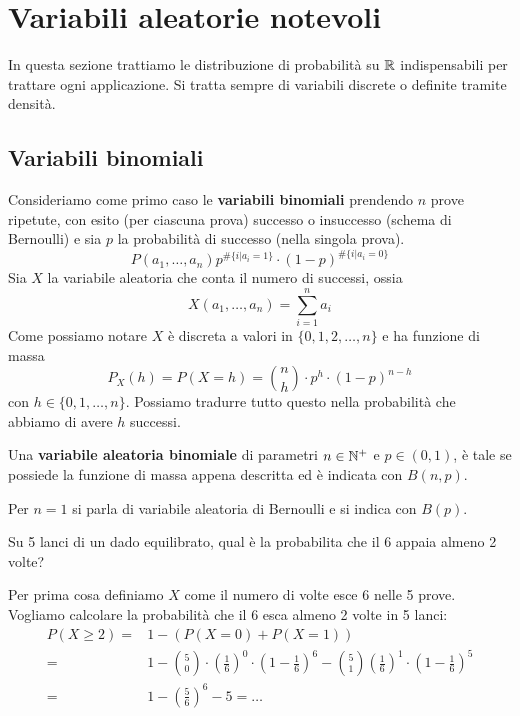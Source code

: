 \section{Variabili aleatorie notevoli}
In questa sezione trattiamo le distribuzione di probabilità su $\mathbb{R}$ indispensabili per trattare
ogni applicazione. Si tratta sempre di variabili discrete o definite tramite densità.

\subsection{Variabili binomiali}
Consideriamo come primo caso le \textbf{variabili binomiali} prendendo $n$ prove ripetute, con
esito (per ciascuna prova) successo o insuccesso (schema di Bernoulli) e sia $p$ la probabilità di
successo (nella singola prova).
\[ P(a_1, \dots, a_n) p^{\# \{i | a_i=1\}} \cdot (1-p)^{\# \{ i | a_i=0 \}} \]
Sia $X$ la variabile aleatoria che conta il numero di successi, ossia
\[ X(a_1, \dots, a_n) = \sum_{i=1}^n a_i \]
Come possiamo notare $X$ è discreta a valori in $\{0,1,2,\dots,n\}$ e ha funzione di massa
\[ P_X(h) = P(X = h) = \binom{n}{h} \cdot p^h \cdot (1-p)^{n-h} \]
con $h \in \{ 0, 1, \dots, n \}$. Possiamo tradurre tutto questo nella probabilità che abbiamo di
avere $h$ successi.

Una \textbf{variabile aleatoria binomiale} di parametri $n \in \mathbb{N}^+$ e $p \in (0,1)$, è tale se
possiede la funzione di massa appena descritta ed è indicata con $B(n, p)$.

\begin{observation}
	Per $n=1$ si parla di variabile aleatoria di Bernoulli e si indica con $B(p)$.
\end{observation}

\begin{example}
	Su 5 lanci di un dado equilibrato, qual è la probabilita che il 6 appaia almeno 2 volte?

	Per prima cosa definiamo $X$ come il numero di volte esce 6 nelle 5 prove. Vogliamo calcolare
	la probabilità che il 6 esca almeno 2 volte in 5 lanci:
	\begin{align*}
		P(X \geq 2) = & 1 - (P(X = 0) + P(X = 1))                               \\
		=             & 1 - \binom{5}{0} \cdot \left(\frac{1}{6}\right)^0 \cdot
		\left(1 - \frac{1}{6}\right)^{6} - \binom{5}{1} \left(\frac{1}{6}\right)^1 \cdot
		\left(1 - \frac{1}{6}\right)^5                                          \\
		=             & 1 - \left( \frac{5}{6} \right)^6 - 5 = \dots
	\end{align*}
\end{example}

